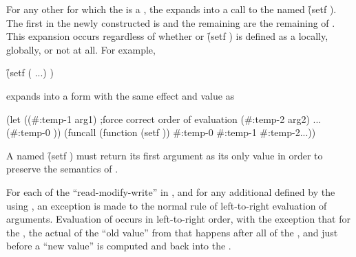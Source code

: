 \endsubsubsection%


For any other  for which the  is a
 ,
the   expands into a call 
to the  named \f{(setf )}.
The first  in the newly constructed 
is  and the
     remaining  are the remaining  of
     .
This expansion occurs regardless of whether  or \f{(setf )}
is defined as a  locally, globally, or not at all.
For example,

\f{(setf (   ...) )}

expands into a form with the same effect and value as

\code
 (let ((#:temp-1 arg1)          ;force correct order of evaluation
       (#:temp-2 arg2)
       ...
       (#:temp-0 ))
   (funcall (function (setf )) #:temp-0 #:temp-1 #:temp-2...))
\endcode

A  named \f{(setf )} must return its first argument
as its only value in order to preserve the semantics of .


\endsubsubsection%


\endsubSection%



For each of the ``read-modify-write''  in \thenextfigure, 
and for any additional  
defined by the  using ,
an exception is made to the normal rule of left-to-right evaluation of arguments.
Evaluation of   occurs in left-to-right order,
with the exception that for the  , the actual
 of the ``old value'' from that  happens 
after all of the   , 
and just before a ``new value'' is computed and  back into the .

